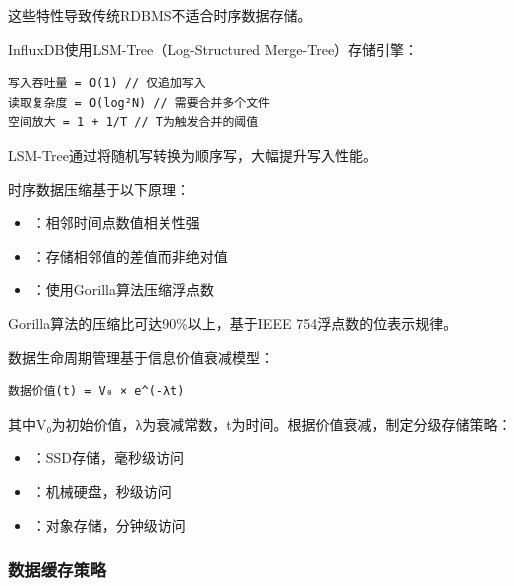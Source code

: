 这些特性导致传统RDBMS不适合时序数据存储。


InfluxDB使用LSM-Tree（Log-Structured Merge-Tree）存储引擎：

\begin{lstlisting}
写入吞吐量 = O(1) // 仅追加写入
读取复杂度 = O(log²N) // 需要合并多个文件
空间放大 = 1 + 1/T // T为触发合并的阈值
\end{lstlisting}

LSM-Tree通过将随机写转换为顺序写，大幅提升写入性能。


时序数据压缩基于以下原理：

\begin{itemize}
\tightlist
\item
  ：相邻时间点数值相关性强
\item
  ：存储相邻值的差值而非绝对值
\item
  ：使用Gorilla算法压缩浮点数
\end{itemize}

Gorilla算法的压缩比可达90\%以上，基于IEEE 754浮点数的位表示规律。


数据生命周期管理基于信息价值衰减模型：

\begin{lstlisting}
数据价值(t) = V₀ × e^(-λt)
\end{lstlisting}

其中V₀为初始价值，λ为衰减常数，t为时间。根据价值衰减，制定分级存储策略：

\begin{itemize}
\tightlist
\item
  ：SSD存储，毫秒级访问
\item
  ：机械硬盘，秒级访问\\
\item
  ：对象存储，分钟级访问
\end{itemize}

\hypertarget{ux6570ux636eux7f13ux5b58ux7b56ux7565}{%
\subsubsection{数据缓存策略}\label{ux6570ux636eux7f13ux5b58ux7b56ux7565}}

